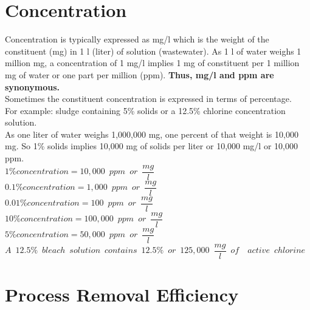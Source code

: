 \section{Concentration}

Concentration is typically expressed as mg/l which is the weight of the constituent (mg) in 1 l (liter) of solution (wastewater).  As 1 l of water weighs 1 million mg, a concentration of 1 mg/l implies 1 mg of constituent per 1 million mg of water or one part per million (ppm).   \textbf{Thus, mg/l and ppm are synonymous.}\\  
Sometimes the constituent concentration is expressed in terms of percentage.\\
\vspace{6pt}
For example:  sludge containing 5\% solids or a 12.5\% chlorine concentration solution.\\
\vspace{6pt}
As one liter of water weighs 1,000,000 mg, one percent of that weight is 10,000 mg.  So 1\% solids implies 10,000 mg of solids per liter or 10,000 mg/l or 10,000 ppm.\\
\vspace{6pt}
$1\% concentration = 10,000 \enspace ppm \enspace or \enspace\dfrac{mg}{l}$\\
\vspace{6pt}
$0.1\% concentration = 1,000 \enspace ppm \enspace or \enspace \dfrac{mg}{l}$\\
\vspace{6pt}
$0.01\% concentration = 100 \enspace ppm \enspace or \enspace \dfrac{mg}{l}$\\
\vspace{6pt}
$10\% concentration = 100,000 \enspace ppm \enspace or \enspace \dfrac{mg}{l}$\\
\vspace{6pt}
$5\% concentration = 50,000 \enspace ppm \enspace or \enspace \dfrac{mg}{l}$\\
\vspace{6pt}
$A \enspace  12.5\% \enspace bleach \enspace solution \enspace contains \enspace 12.5\% \enspace or \enspace 125,000 \enspace \dfrac{mg}{l} \enspace of \enspace \enspace active \enspace chlorine $

\section{Process Removal Efficiency}

